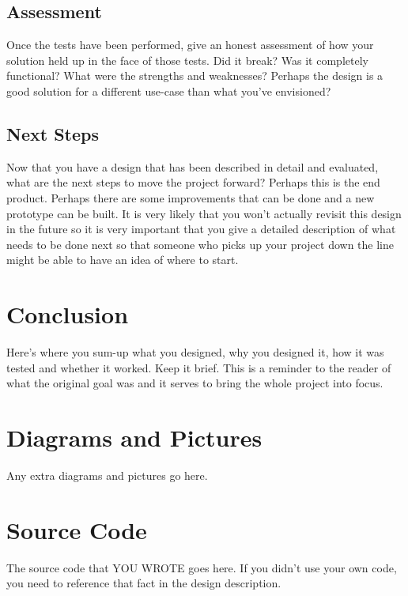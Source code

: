 \documentclass[journal]{IEEEtran}
\begin{document}
\subsection{Assessment}
Once the tests have been performed, give an honest assessment of how your solution held up in the face of 
those tests. Did it break? Was it completely functional? What were the strengths and weaknesses? Perhaps 
the design is a good solution for a different use-case than what you've envisioned?

\subsection{Next Steps}
Now that you have a design that has been described in detail and evaluated, what are the next steps to move
the project forward? Perhaps this is the end product. Perhaps there are some improvements that can be done
and a new prototype can be built. It is very likely that you won't actually revisit this design in the future
so it is very important that you give a detailed description of what needs to be done next so that someone
who picks up your project down the line might be able to have an idea of where to start. 

\section{Conclusion}
Here's where you sum-up what you designed, why you designed it, how it was tested and whether it worked. Keep
it brief. This is a reminder to the reader of what the original goal was and it serves to bring the whole 
project into focus. 

\appendices
\section{Diagrams and Pictures}
Any extra diagrams and pictures go here.
\section{Source Code}
The source code that YOU WROTE goes here. If you didn't use your own code, you need to reference that fact 
in the design description. 
\end{document}

